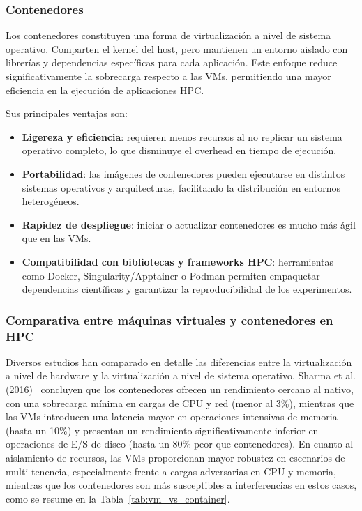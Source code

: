 \subsubsection{Contenedores}

Los contenedores constituyen una forma de virtualización a nivel de sistema operativo. Comparten el kernel del host, pero mantienen un entorno aislado con librerías y dependencias específicas para cada aplicación. Este enfoque reduce significativamente la sobrecarga respecto a las VMs, permitiendo una mayor eficiencia en la ejecución de aplicaciones HPC.

Sus principales ventajas son:
\begin{itemize}
    \item \textbf{Ligereza y eficiencia}: requieren menos recursos al no replicar un sistema operativo completo, lo que disminuye el overhead en tiempo de ejecución.
    \item \textbf{Portabilidad}: las imágenes de contenedores pueden ejecutarse en distintos sistemas operativos y arquitecturas, facilitando la distribución en entornos heterogéneos.
    \item \textbf{Rapidez de despliegue}: iniciar o actualizar contenedores es mucho más ágil que en las VMs.
    \item \textbf{Compatibilidad con bibliotecas y frameworks HPC}: herramientas como Docker, Singularity/Apptainer o Podman permiten empaquetar dependencias científicas y garantizar la reproducibilidad de los experimentos.
\end{itemize}

\subsubsection{Comparativa entre máquinas virtuales y contenedores en HPC}

Diversos estudios han comparado en detalle las diferencias entre la virtualización a nivel de hardware y la virtualización a nivel de sistema operativo. Sharma et al. (2016)~\cite{sharma2016containers} concluyen que los contenedores ofrecen un rendimiento cercano al nativo, con una sobrecarga mínima en cargas de CPU y red (menor al 3\%), mientras que las VMs introducen una latencia mayor en operaciones intensivas de memoria (hasta un 10\%) y presentan un rendimiento significativamente inferior en operaciones de E/S de disco (hasta un 80\% peor que contenedores). En cuanto al aislamiento de recursos, las VMs proporcionan mayor robustez en escenarios de multi-tenencia, especialmente frente a cargas adversarias en CPU y memoria, mientras que los contenedores son más susceptibles a interferencias en estos casos, como se resume en la Tabla~\ref{tab:vm_vs_container}.

